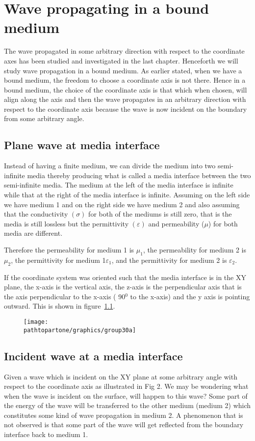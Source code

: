\chapter{Wave propagating in a bound medium}\label{lec:lec30}
The wave propagated in some arbitrary direction with respect to the coordinate axes has been studied and investigated in the last chapter. Henceforth we will study wave propagation in a bound medium. As earlier stated, when we have a bound medium, the freedom to choose a coordinate axis is not there. Hence in a bound medium, the choice of the coordinate axis is that which when chosen, will align along the axis and then the wave propagates in an arbitrary direction with respect to the coordinate axis because the wave is now incident on the boundary from some arbitrary angle.

\section{Plane wave at media interface}

Instead of having a finite medium, we can divide the medium into two semi-infinite media thereby producing what is called a media interface between the two semi-infinite media. The medium at the left of the media interface is infinite while that at the right of the media interface is infinite. Assuming on the left side we have medium 1 and on the right side we have medium 2 and also assuming that the conductivity $(\sigma)$ for both of the mediums is still zero, that is the media is still lossless but the permittivity $(\varepsilon)$ and permeability ($\mu$) for both media are different.

Therefore the permeability for medium 1 is $\mu_1$, the permeability for medium 2 is $\mu_2$, the permittivity for medium 1$\varepsilon_1$, and the permittivity for medium 2 is $\varepsilon_2$.

If the coordinate system was oriented such that the media interface is in the XY plane, the x-axis is the vertical axis, the z-axis is the perpendicular axis that is the axis perpendicular to the x-axis ( 90$^{0}$ to the x-axis) and the y axis is pointing outward. This is shown in figure~\ref{fig:group30a}.
\begin{figure}[h]
\centering
\texttt{[image: \\pathtopartone/graphics/group30a]}
\caption{}
\label{fig:group30a}
\end{figure}

\section{Incident wave at a media interface}
Given a wave which is incident on the XY plane at some arbitrary angle with respect to the coordinate axis as illustrated in Fig 2. We may be wondering what when the wave is incident on the surface, will happen to this wave? Some part of the energy of the wave will be transferred to the other medium (medium 2) which constitutes some kind of wave propagation in medium 2. A phenomenon that is not observed is that some part of the wave will get reflected from the boundary interface back to medium 1.

